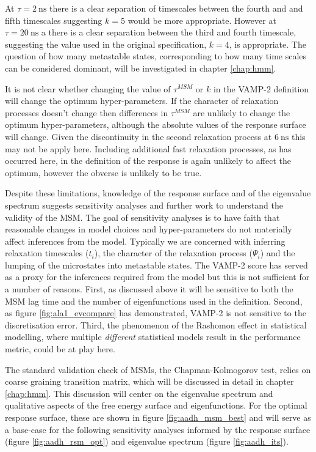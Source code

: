 At $\tau = \SI{2}{\nano\second}$ there is a clear separation of timescales between the fourth and and fifth timescales suggesting $k=5$ would be more appropriate. However at $\tau = \SI{20}{\nano\second}$ a there is a clear separation between the third and fourth timescale, suggesting the value used in the original specification, $k=4$, is appropriate.  The question of how many metastable states, corresponding to how many time scales can be considered dominant, will be investigated in chapter \ref{chap:hmm}. 

It is not clear whether changing the value of $\tau^{MSM}$ or $k$ in the VAMP-2 definition will change the optimum hyper-parameters. If the character of relaxation processes doesn't change then differences in $\tau^{MSM}$ are unlikely to change the optimum hyper-parameters, although the absolute values of the response surface will change. Given the discontinuity in the second relaxation process at $\SI{6}{\nano\second}$ this may not be apply here. Including additional fast relaxation processes, as has occurred here, in the definition of the response is again unlikely to affect the optimum, however the obverse is unlikely to be true.

Despite these limitations, knowledge of the response surface and of the eigenvalue spectrum suggests sensitivity analyses and further work to understand the validity of the MSM.  The goal of sensitivity analyses is to have faith that reasonable changes in model choices and hyper-parameters do not materially affect inferences from the model. Typically we are concerned with inferring relaxation timescales ($t_{i}$), the character of the relaxation process ($\Psi_{i}$) and the lumping of the microstates into metastable states. The VAMP-2 score has served as a proxy for the inferences required from the model but this is not sufficient  for a number of reasons.  First, as discussed above it will be sensitive to both the MSM lag time and the number of eigenfunctions used in the definition. Second, as figure \ref{fig:ala1_evcompare} has demonstrated, VAMP-2 is not sensitive to the discretisation error. Third, the phenomenon of the Rashomon effect \cite{BreimanStatisticalModeling} in statistical modelling, where  multiple \emph{different} statistical models result in the performance metric, could be at play here.

The standard validation check of MSMs, the Chapman-Kolmogorov test, relies on coarse graining transition matrix, which will be discussed in detail in chapter \ref{chap:hmm}. This discussion will center on the eigenvalue spectrum and qualitative aspects of the free energy surface and eigenfunctions.  For the optimal response surface, these are shown in figure \ref{fig:aadh_msm_best} and will serve as a base-case for the following sensitivity analyses informed by the response surface (figure \ref{fig:aadh_rsm_opt}) and eigenvalue spectrum (figure \ref{fig:aadh_its}).

